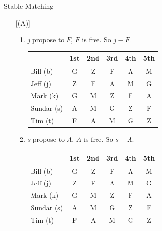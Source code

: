 \documentclass{article}
\numberwithin{table}{section}
\numberwithin{figure}{section}
\begin{document}
\begin{section}{Stable Matching}
\begin{enumerate} [(A)]
\begin{enumerate}[(1)]
\begin{tcolorbox}[breakable]
\begin{enumerate}[(1)]
                    \item $j$ propose to $F$, $F$ is free. So $j-F$.
                    \begin{table}[H]
                        \centering
                        \begin{tabular}{|m{2.5cm}|*{5}{c|}}
                            \hline
                            & 1st & 2nd & 3rd & 4th & 5th \\
                            \hline
                            Bill (b)        & {\color{blue} G} & {\color{red} Z} & F & A & M \\
                            Jeff (j)        & {\color{blue} Z} & {\color{red} F} & A & M & G \\
                            Mark (k)        & {\color{red} G} & M & Z & F & A \\
                            Sundar (s)      & A & M & G & Z & F \\
                            Tim (t)         & F & A & M & G & Z \\
                            \hline                            
                        \end{tabular}
                    \end{table}

                    \item $s$ propose to $A$, $A$ is free. So $s-A$.
                    \begin{table}[H]
                        \centering
                        \begin{tabular}{|m{2.5cm}|*{5}{c|}}
                            \hline
                            & 1st & 2nd & 3rd & 4th & 5th \\
                            \hline
                            Bill (b)        & {\color{blue} G} & {\color{red} Z} & F & A & M \\
                            Jeff (j)        & {\color{blue} Z} & {\color{red} F} & A & M & G \\
                            Mark (k)        & {\color{red} G} & M & Z & F & A \\
                            Sundar (s)      & {\color{red} A} & M & G & Z & F \\
                            Tim (t)         & F & A & M & G & Z \\
                            \hline                            
                        \end{tabular}
                    \end{table}


\end{enumerate}
\end{tcolorbox}
\end{enumerate}
\end{enumerate}
\end{section}
\end{document}
